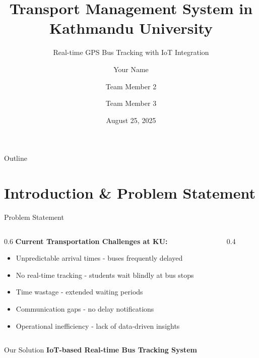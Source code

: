 \documentclass[aspectratio=169]{beamer}
\title[Transport Management System]{Transport Management System in Kathmandu University}
\subtitle{Real-time GPS Bus Tracking with IoT Integration}
\author[Team Members]{Your Name \and Team Member 2 \and Team Member 3}
\institute[KU]{Kathmandu University\\Department of Computer Science and Engineering}
\date{August 25, 2025}
\begin{document}
\begin{frame}
    \titlepage
\end{frame}

\begin{frame}{Outline}
    \tableofcontents
\end{frame}

\section{Introduction \& Problem Statement}

\begin{frame}{Problem Statement}
    \begin{columns}
        \begin{column}{0.6\textwidth}
            \textbf{Current Transportation Challenges at KU:}
            \begin{itemize}
                \item \alert{Unpredictable arrival times} - buses frequently delayed
                \item \alert{No real-time tracking} - students wait blindly at bus stops
                \item \alert{Time wastage} - extended waiting periods
                \item \alert{Communication gaps} - no delay notifications
                \item \alert{Operational inefficiency} - lack of data-driven insights
            \end{itemize}
        \end{column}
        \begin{column}{0.4\textwidth}
        \end{column}
    \end{columns}
    
    \vspace{0.5cm}
    \begin{block}{Our Solution}
        \centering
        \textbf{IoT-based Real-time Bus Tracking System}
    \end{block}
\end{frame}
\end{document}

